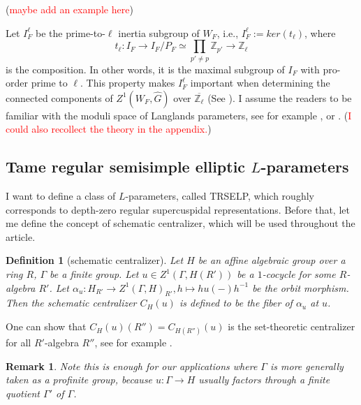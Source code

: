 \documentclass{article}
\newcommand{\red}[1]{\textcolor{red}{#1}}
\newtheorem*{remark}{Remark}
\newtheorem{definition}{Definition}
\begin{document}
	(\red{maybe add an example here})
	
	Let $I_F^{\ell}$ be the prime-to-$\ell$ inertia subgroup of $W_F$, i.e., $I_F^{\ell}:=ker(t_{\ell})$, where 
	$$t_\ell: I_F \to I_F/P_F \simeq \prod_{p' \neq p}\mathbb{Z}_{p'} \to \mathbb{Z}_\ell$$
	is the composition. In other words, it is the maximal subgroup of $I_F$ with pro-order prime to $\ell$. This property makes $I_F^{\ell}$ important when determining the connected components of $Z^1(W_F, \hat{G})$ over $\overline{\mathbb{Z}_{\ell}}$ (See \cite[Theorem 4.2 and Subsection 4.6]{dat2022ihes}). I assume the readers to be familiar with the moduli space of Langlands parameters, see for example \cite[Section 3 and Section 4]{dat2022ihes}, or \cite[Section 2 and Section 4]{dhkm2020moduli}. (\red{I could also recollect the theory in the appendix.})
	
	\subsection{Tame regular semisimple elliptic $L$-parameters}
	
	I want to define a class of $L$-parameters, called TRSELP, which roughly corresponds to depth-zero regular supercuspidal representations. Before that, let me define the concept of schematic centralizer, which will be used throughout the article.
	
	\begin{definition}[schematic centralizer]
	Let $H$ be an affine algebraic group over a ring $R$, $\Gamma$ be a finite group. Let $u \in Z^1(\Gamma, H(R'))$ be a $1$-cocycle for some $R$-algebra $R'$. Let $\alpha_u: H_{R'} \to Z^1(\Gamma, H)_{R'}, h \mapsto hu(-)h^{-1}$ be the orbit morphism. Then the schematic centralizer $C_H(u)$ is defined to be the fiber of $\alpha_u$ at $u$.
		
		
	\end{definition}
	
	One can show that $C_H(u)(R'')=C_{H(R'')}(u)$ is the set-theoretic centralizer for all $R'$-algebra $R''$, see for example \cite[Appendix]{dhkm2020moduli}.
	
	\begin{remark}
			Note this is enough for our applications where $\Gamma$ is more generally taken as a profinite group, because $u: \Gamma \to H$ usually factors through a finite quotient $\Gamma'$ of $\Gamma$.
	\end{remark}
	
\end{document}
